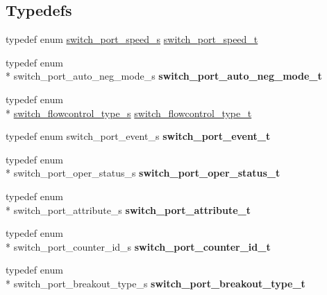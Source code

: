 \subsection*{Typedefs}
\begin{DoxyCompactItemize}
\item 
typedef enum \hyperlink{group__Port_ga2b4ab95653b3e16a2f0ccab9982be20d}{switch\+\_\+port\+\_\+speed\+\_\+s} \hyperlink{group__Port_ga29ae043889998625e4f817091229005c}{switch\+\_\+port\+\_\+speed\+\_\+t}
\item 
\hypertarget{group__Port_ga48e87502b7defc96102d7bff406deb1e}{typedef enum \\*
switch\+\_\+port\+\_\+auto\+\_\+neg\+\_\+mode\+\_\+s {\bfseries switch\+\_\+port\+\_\+auto\+\_\+neg\+\_\+mode\+\_\+t}}\label{group__Port_ga48e87502b7defc96102d7bff406deb1e}

\item 
typedef enum \\*
\hyperlink{group__Port_gad978f1f45abc92d529c0d6c1d8d75228}{switch\+\_\+flowcontrol\+\_\+type\+\_\+s} \hyperlink{group__Port_gad870ecb5980b7fdef2532fbe7ca653db}{switch\+\_\+flowcontrol\+\_\+type\+\_\+t}
\item 
\hypertarget{group__Port_ga2252195b96024d5e3a05c6005c85c330}{typedef enum switch\+\_\+port\+\_\+event\+\_\+s {\bfseries switch\+\_\+port\+\_\+event\+\_\+t}}\label{group__Port_ga2252195b96024d5e3a05c6005c85c330}

\item 
\hypertarget{group__Port_ga361c8fc3f43dc3741b391b2bd020e7de}{typedef enum \\*
switch\+\_\+port\+\_\+oper\+\_\+status\+\_\+s {\bfseries switch\+\_\+port\+\_\+oper\+\_\+status\+\_\+t}}\label{group__Port_ga361c8fc3f43dc3741b391b2bd020e7de}

\item 
\hypertarget{group__Port_gad6d9b55513602117ea5644d738dc242d}{typedef enum \\*
switch\+\_\+port\+\_\+attribute\+\_\+s {\bfseries switch\+\_\+port\+\_\+attribute\+\_\+t}}\label{group__Port_gad6d9b55513602117ea5644d738dc242d}

\item 
\hypertarget{group__Port_ga2c38883fce229f93d075322206e0e792}{typedef enum \\*
switch\+\_\+port\+\_\+counter\+\_\+id\+\_\+s {\bfseries switch\+\_\+port\+\_\+counter\+\_\+id\+\_\+t}}\label{group__Port_ga2c38883fce229f93d075322206e0e792}

\item 
\hypertarget{group__Port_ga9600a9b1829d8b2ec95f8ca4907eab11}{typedef enum \\*
switch\+\_\+port\+\_\+breakout\+\_\+type\+\_\+s {\bfseries switch\+\_\+port\+\_\+breakout\+\_\+type\+\_\+t}}\label{group__Port_ga9600a9b1829d8b2ec95f8ca4907eab11}


\end{DoxyCompactItemize}
